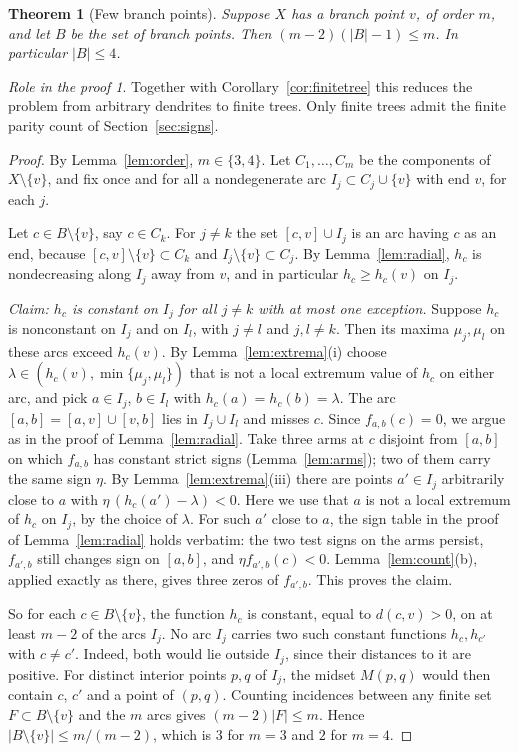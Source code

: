 \documentclass[11pt]{amsart}
\newtheorem{theorem}{Theorem}[section]
\theoremstyle{definition}
\theoremstyle{remark}
\newtheorem*{role}{Role in the proof}
\newcommand{\M}{M}
\begin{document}
\begin{theorem}[Few branch points]\label{thm:branchcount}
Suppose $X$ has a branch point $v$, of order $m$, and let $B$ be the set of branch points. Then $(m-2)(|B|-1)\le m$. In particular $|B|\le4$.
\end{theorem}

\begin{role}
Together with Corollary~\ref{cor:finitetree} this reduces the problem from arbitrary dendrites to finite trees. Only finite trees admit the finite parity count of Section~\ref{sec:signs}.
\end{role}

\begin{proof}
By Lemma~\ref{lem:order}, $m\in\{3,4\}$. Let $C_1,\dots,C_m$ be the components of $X\setminus\{v\}$, and fix once and for all a nondegenerate arc $I_j\subset C_j\cup\{v\}$ with end $v$, for each $j$.

Let $c\in B\setminus\{v\}$, say $c\in C_k$. For $j\ne k$ the set $[c,v]\cup I_j$ is an arc having $c$ as an end, because $[c,v]\setminus\{v\}\subset C_k$ and $I_j\setminus\{v\}\subset C_j$. By Lemma~\ref{lem:radial}, $h_c$ is nondecreasing along $I_j$ away from $v$, and in particular $h_c\ge h_c(v)$ on $I_j$.

\emph{Claim: $h_c$ is constant on $I_j$ for all $j\ne k$ with at most one exception.} Suppose $h_c$ is nonconstant on $I_j$ and on $I_l$, with $j\ne l$ and $j,l\ne k$. Then its maxima $\mu_j,\mu_l$ on these arcs exceed $h_c(v)$. By Lemma~\ref{lem:extrema}(i) choose $\lambda\in(h_c(v),\min\{\mu_j,\mu_l\})$ that is not a local extremum value of $h_c$ on either arc, and pick $a\in I_j$, $b\in I_l$ with $h_c(a)=h_c(b)=\lambda$. The arc $[a,b]=[a,v]\cup[v,b]$ lies in $I_j\cup I_l$ and misses $c$. Since $f_{a,b}(c)=0$, we argue as in the proof of Lemma~\ref{lem:radial}. Take three arms at $c$ disjoint from $[a,b]$ on which $f_{a,b}$ has constant strict signs (Lemma~\ref{lem:arms}); two of them carry the same sign $\eta$. By Lemma~\ref{lem:extrema}(iii) there are points $a'\in I_j$ arbitrarily close to $a$ with $\eta\,(h_c(a')-\lambda)<0$. Here we use that $a$ is not a local extremum of $h_c$ on $I_j$, by the choice of $\lambda$. For such $a'$ close to $a$, the sign table in the proof of Lemma~\ref{lem:radial} holds verbatim: the two test signs on the arms persist, $f_{a',b}$ still changes sign on $[a,b]$, and $\eta f_{a',b}(c)<0$. Lemma~\ref{lem:count}(b), applied exactly as there, gives three zeros of $f_{a',b}$. This proves the claim.

So for each $c\in B\setminus\{v\}$, the function $h_c$ is constant, equal to $d(c,v)>0$, on at least $m-2$ of the arcs $I_j$. No arc $I_j$ carries two such constant functions $h_c,h_{c'}$ with $c\ne c'$. Indeed, both would lie outside $I_j$, since their distances to it are positive. For distinct interior points $p,q$ of $I_j$, the midset $\M(p,q)$ would then contain $c$, $c'$ and a point of $(p,q)$. Counting incidences between any finite set $F\subset B\setminus\{v\}$ and the $m$ arcs gives $(m-2)|F|\le m$. Hence $|B\setminus\{v\}|\le m/(m-2)$, which is $3$ for $m=3$ and $2$ for $m=4$.
\end{proof}
\end{document}
